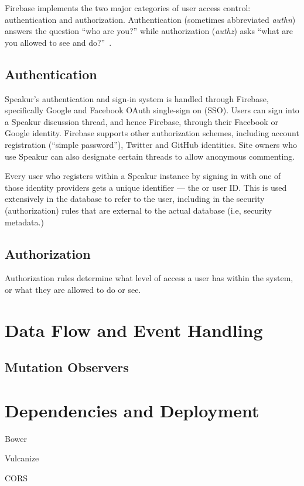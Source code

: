 Firebase implements the two major categories of user access control: authentication and 
authorization. 
Authentication (sometimes abbreviated \textit{authn}) answers the question ``who are you?'' 
while authorization (\textit{authz}) asks ``what are you allowed to see and do?''~\cite{stallings2011}.


\subsection{Authentication}

Speakur's authentication and sign-in system is handled through Firebase, 
specifically Google and Facebook OAuth single-sign on (SSO).
Users can sign into a Speakur discussion thread, and hence Firebase, through their Facebook or Google identity.
Firebase supports other authorization schemes, including account registration (``simple password''), Twitter and GitHub identities.
Site owners who use Speakur can also designate certain threads to allow anonymous commenting.

Every user who registers within a Speakur instance by signing in with one of those identity providers gets a unique identifier --- the  or user ID. 
This  is used extensively in the database to refer to the user, including in the security (authorization) rules that are external to the actual database (i.e, security metadata.) 

\subsection{Authorization}
Authorization rules determine what level of access a user has within the system, or what they are allowed to do or see.


\section{Data Flow and Event Handling}

\subsection{Mutation Observers}

\section{Dependencies and Deployment}

Bower

Vulcanize

CORS

